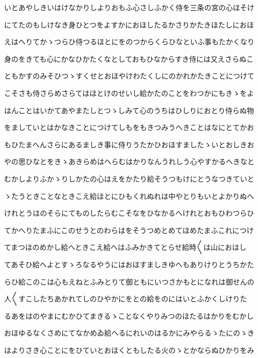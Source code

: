 \documentclass[a4paper,11pt,landscape]{ltjtarticle}
\begin{document}
いとあやしきいはけなかりしよりおもふ心さしふかく侍を三条の宮の心ほそけ
\par\medskip
にてたのもしけなき身ひとつをよすかにおほしたるかさりかたきほたしにおほ
\par\medskip
えはへりてかゝつらひ侍つるほとにをのつからくらひなといふ事もたかくなり
\par\medskip
身のをきても心にかなひかたくなとしておもひなからすき侍には又えさらぬこ
\par\medskip
ともかすのみそひつゝすくせとおほやけわたくしにのかれかたきことにつけて
\par\medskip
こそさも侍さらめさらてはほとけのせいし給かたのことをわつかにもきゝをよ
\par\medskip
はんことはいかてあやまたしとつゝしみて心のうちはひしりにおとり侍らぬ物
\par\medskip
をましていとはかなきことにつけてしもをもきつみうへきことはなにとてかお
\par\medskip
もひたまへんさらにあるましき事に侍りうたかひおほすましたゝいとおしきお
\par\medskip
やの思ひなとをきゝあきらめはへらむはかりなんうれしう心やすかるへきなと
\par\medskip
むかしよりふかゝりしかたの心はえをかたり給そうつもけにとうなつきていと
\par\medskip
ゝたうときことなときこえ給ほとにひもくれぬれは中やとりもいとよかりぬへ
\par\medskip
けれとうはのそらにてものしたらむこそなをひなかるへけれとおもひわつらひ
\par\medskip
てかへりたまふにこのせうとのわらはをそうつめとめてほめたまふこれにつけ
\par\medskip
てまつほのめかし給へときこえ給へはふみかきてとらせ給時〱は山におはし
\par\medskip
てあそひ給へよとすゝろなるやうにはおほすましきゆへもありけりとうちかた
\par\medskip
らひ給このこは心もえねとふみとりて御ともにいつさかもとになれは御せんの
\par\medskip
人〱すこしたちあかれてしのひやかにをとの給をのにはいとふかくしけりた
\par\medskip
るあをはのやまにむかひてまきるゝことなくやりみつのほたるはかりをむかし
\par\medskip
おほゆるなくさめにてなかめゐ給へるにれいのはるかにみやらるゝたにのゝき
\par\medskip
はよりさき心ことにをひていとおほくともしたる火のゝとかならぬひかりをみ
\par\medskip
\end{document}
